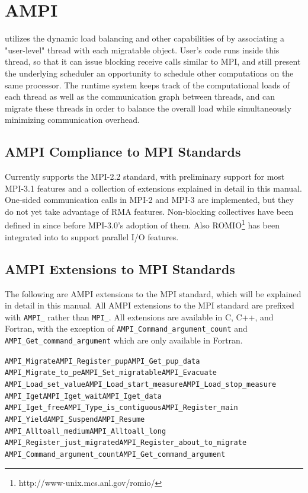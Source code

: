 \documentclass[10pt]{article}
\begin{document}
\section{AMPI}

\ampi{} utilizes the dynamic load balancing and other capabilities of \charmpp{} by
associating a "user-level" thread with each \charmpp{} migratable object.
User's code runs inside this thread, so that it can issue blocking receive
calls similar to MPI, and still present the underlying scheduler an opportunity
to schedule other computations on the same processor. The runtime system keeps
track of the computational loads of each thread as well as the communication graph
between \ampi{} threads, and can migrate these threads in order to balance the
overall load while simultaneously minimizing communication overhead.

\subsection{AMPI Compliance to MPI Standards}

Currently \ampi{} supports the MPI-2.2 standard, with preliminary support for most MPI-3.1
features and a collection of extensions explained in detail in this manual. One-sided
communication calls in MPI-2 and MPI-3 are implemented, but they do not yet
take advantage of RMA features. Non-blocking collectives have been defined in
\ampi{} since before MPI-3.0's adoption of them. Also
ROMIO\footnote{http://www-unix.mcs.anl.gov/romio/} has been integrated into
\ampi{} to support parallel I/O features.

\subsection{AMPI Extensions to MPI Standards}

The following are AMPI extensions to the MPI standard, which will be explained in
detail in this manual. All AMPI extensions to the MPI standard are prefixed with
\texttt{AMPI\_} rather than \texttt{MPI\_}. All extensions are available in C, C++, and Fortran,
with the exception of \texttt{AMPI\_Command\_argument\_count} and
\texttt{AMPI\_Get\_command\_argument} which are only available in Fortran.

\begin{alltt}
AMPI_Migrate          AMPI_Register_pup            AMPI_Get_pup_data
AMPI_Migrate_to_pe    AMPI_Set_migratable          AMPI_Evacuate
AMPI_Load_set_value   AMPI_Load_start_measure      AMPI_Load_stop_measure
AMPI_Iget             AMPI_Iget_wait               AMPI_Iget_data
AMPI_Iget_free        AMPI_Type_is_contiguous      AMPI_Register_main
AMPI_Yield            AMPI_Suspend                 AMPI_Resume
AMPI_Alltoall_medium  AMPI_Alltoall_long
AMPI_Register_just_migrated         AMPI_Register_about_to_migrate
AMPI_Command_argument_count         AMPI_Get_command_argument
\end{alltt}
\end{document}

